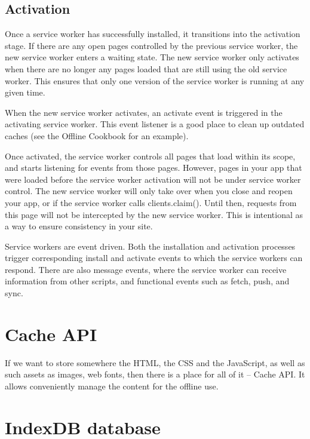\subsection*{Activation}


Once a service worker has successfully installed, it transitions into the activation stage. If there are any open pages controlled by the previous service worker, the new service worker enters a waiting state. The new service worker only activates when there are no longer any pages loaded that are still using the old service worker. This ensures that only one version of the service worker is running at any given time.

When the new service worker activates, an activate event is triggered in the activating service worker. This event listener is a good place to clean up outdated caches (see the Offline Cookbook for an example).

Once activated, the service worker controls all pages that load within its scope, and starts listening for events from those pages. However, pages in your app that were loaded before the service worker activation will not be under service worker control. The new service worker will only take over when you close and reopen your app, or if the service worker calls clients.claim(). Until then, requests from this page will not be intercepted by the new service worker. This is intentional as a way to ensure consistency in your site.

Service workers are event driven. Both the installation and activation processes trigger corresponding install and activate events to which the service workers can respond. There are also message events, where the service worker can receive information from other scripts, and functional events such as fetch, push, and sync.

\section{Cache API}




If we want to store somewhere the HTML, the CSS and the JavaScript, as well as such assets as images, web fonts, then there is a place for all of it -- Cache API. It allows conveniently manage the content for the offline use. 

\section{IndexDB database}

